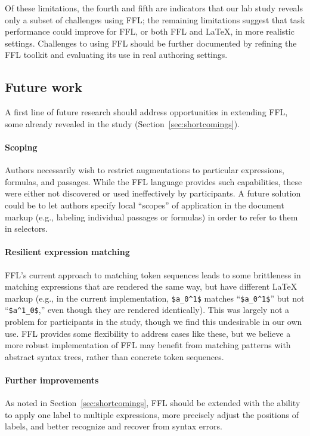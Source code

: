 Of these limitations, the fourth and fifth are indicators that our lab study reveals only a subset of challenges using FFL; the remaining limitations suggest that task performance could improve for FFL, or both FFL and LaTeX, in more realistic settings. Challenges to using FFL should be further documented by refining the FFL toolkit and evaluating its use in real authoring settings.

\subsection{Future work}

A first line of future research should address opportunities in extending FFL, some already revealed in the study (Section~\ref{sec:shortcomings}).

\paragraph{Scoping} Authors necessarily wish to restrict augmentations to particular expressions, formulas, and passages. While the FFL language provides such capabilities, these were either not discovered or used ineffectively by participants. A future solution could be to let authors specify local ``scopes'' of application in the document markup (e.g., labeling individual passages or formulas) in order to refer to them in selectors.

\paragraph{Resilient expression matching} FFL's current approach to matching token sequences leads to some brittleness in matching expressions that are rendered the same way, but have different LaTeX markup (e.g., in the current implementation, \texttt{\$a\_0\textasciicircum{}1\$} matches ``\texttt{\$a\_0\textasciicircum{}1\$}'' but not ``\texttt{\$a\textasciicircum{}1\_0\$},'' even though they are rendered identically). This was largely not a problem for participants in the study, though we find this undesirable in our own use. FFL provides some flexibility to address cases like these, but we believe a more robust implementation of FFL may benefit from matching patterns with abstract syntax trees, rather than concrete token sequences.

\paragraph{Further improvements} 
As noted in Section~\ref{sec:shortcomings}, FFL should be extended with the ability to apply one label to multiple expressions, more precisely adjust the positions of labels, and better recognize and recover from syntax errors.

